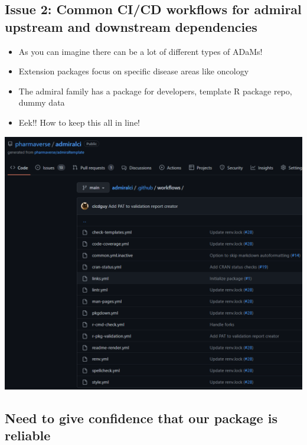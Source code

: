 \documentclass[
  letterpaper,
  DIV=11,
  numbers=noendperiod]{scrartcl}
\providecommand{\tightlist}{%
  \setlength{\itemsep}{0pt}\setlength{\parskip}{0pt}}\usepackage{longtable,booktabs,array}
\begin{document}
\hypertarget{issue-2-common-cicd-workflows-for-admiral-upstream-and-downstream-dependencies}{%
\subsection{Issue 2: Common CI/CD workflows for admiral upstream and
downstream
dependencies}\label{issue-2-common-cicd-workflows-for-admiral-upstream-and-downstream-dependencies}}

\begin{itemize}
\tightlist
\item
  As you can imagine there can be a lot of different types of ADaMs!
\item
  Extension packages focus on specific disease areas like oncology
\item
  The admiral family has a package for developers, template R package
  repo, dummy data
\item
  Eek!! How to keep this all in line!
\end{itemize}

\includegraphics{admiralci.png}

\hypertarget{need-to-give-confidence-that-our-package-is-reliable}{%
\subsection{Need to give confidence that our package is
reliable}\label{need-to-give-confidence-that-our-package-is-reliable}}
\end{document}
